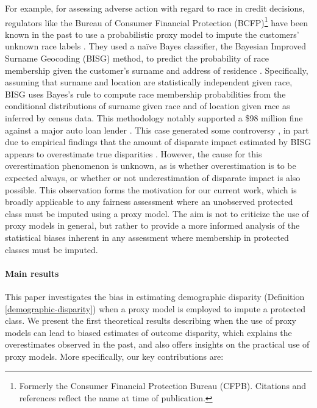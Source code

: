 For example, for assessing adverse action with regard to race in credit decisions, regulators like the Bureau of Consumer Financial Protection (BCFP)\footnote{Formerly the Consumer Financial Protection Bureau (CFPB). Citations and references reflect the name at time of publication.}  have been known in the past to use a probabilistic proxy model to impute the customers' unknown race labels \cite{CFPB:proxy2014}.
They used a na\"ive Bayes classifier, the Bayesian Improved Surname Geocoding (BISG) method, to predict the probability of race membership given the customer's surname and address of residence \cite{Elliott:2009aa}.
Specifically, assuming that surname and location are statistically independent given race, BISG uses Bayes's rule to
compute race membership probabilities from
the conditional distributions of surname given race and of location given race as inferred by census data.
This methodology \cite{CFPB:proxy2014} notably supported a \$98 million fine against a major auto loan lender \cite{CFPB:ally2013}.
This case generated some controversy \cite{Koren:2016aa,CFS:2015,CFS:2016,CFS:2017,CFPB:2018-05}, in part due to empirical findings that the amount of disparate impact estimated by BISG appears to overestimate true disparities \cite{Baines:2014aa,zhang2016assessing}.
However, the cause for this overestimation phenomenon is unknown, as is whether overestimation is to be expected always, or whether or not underestimation of disparate impact is also possible.
This observation forms the motivation for our current work, which is broadly applicable to any fairness assessment where an unobserved protected class must be imputed using a proxy model.
The aim is not to criticize the use of proxy models in general, but rather to provide a more informed analysis of the statistical biases inherent in any assessment where membership in protected classes must be imputed.


\paragraph{Main results}

This paper investigates the bias in estimating demographic disparity (Definition \ref{demographic-disparity}) when a proxy model is employed to impute a protected class.
We present the first theoretical results describing when the use of proxy models can lead to biased estimates of outcome disparity,
which explains the overestimates observed in the past, and also offers insights on the practical use of proxy models.
More specifically, our key contributions are:

